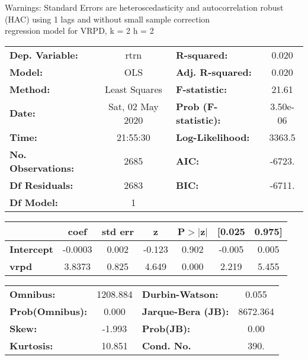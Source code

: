 Warnings: \newline
 [1] Standard Errors are heteroscedasticity and autocorrelation robust (HAC) using 1 lags and without small sample correction\\ 

regression model for VRPD, k = 2 h = 2\begin{center}
\begin{tabular}{lclc}
\toprule
\textbf{Dep. Variable:}    &       rtrn       & \textbf{  R-squared:         } &     0.020   \\
\textbf{Model:}            &       OLS        & \textbf{  Adj. R-squared:    } &     0.020   \\
\textbf{Method:}           &  Least Squares   & \textbf{  F-statistic:       } &     21.61   \\
\textbf{Date:}             & Sat, 02 May 2020 & \textbf{  Prob (F-statistic):} &  3.50e-06   \\
\textbf{Time:}             &     21:55:30     & \textbf{  Log-Likelihood:    } &    3363.5   \\
\textbf{No. Observations:} &        2685      & \textbf{  AIC:               } &    -6723.   \\
\textbf{Df Residuals:}     &        2683      & \textbf{  BIC:               } &    -6711.   \\
\textbf{Df Model:}         &           1      & \textbf{                     } &             \\
\bottomrule
\end{tabular}
\begin{tabular}{lcccccc}
                   & \textbf{coef} & \textbf{std err} & \textbf{z} & \textbf{P$> |$z$|$} & \textbf{[0.025} & \textbf{0.975]}  \\
\midrule
\textbf{Intercept} &      -0.0003  &        0.002     &    -0.123  &         0.902        &       -0.005    &        0.005     \\
\textbf{vrpd}      &       3.8373  &        0.825     &     4.649  &         0.000        &        2.219    &        5.455     \\
\bottomrule
\end{tabular}
\begin{tabular}{lclc}
\textbf{Omnibus:}       & 1208.884 & \textbf{  Durbin-Watson:     } &    0.055  \\
\textbf{Prob(Omnibus):} &   0.000  & \textbf{  Jarque-Bera (JB):  } & 8672.364  \\
\textbf{Skew:}          &  -1.993  & \textbf{  Prob(JB):          } &     0.00  \\
\textbf{Kurtosis:}      &  10.851  & \textbf{  Cond. No.          } &     390.  \\
\bottomrule
\end{tabular}
\end{center}

